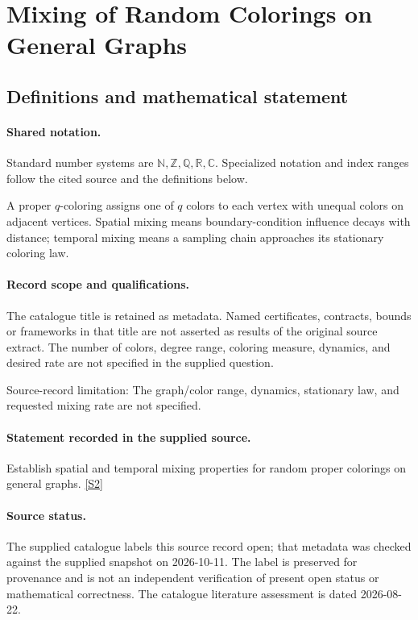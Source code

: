\documentclass[11pt]{article}
\newcommand{\sref}[2]{\hyperlink{source:#1:#2}{[S#2]}}
\begin{document}
\section{Mixing of Random Colorings on General Graphs}\label{statement}

\subsection{Definitions and mathematical statement}

\paragraph{Shared notation.}Standard number systems are $\mathbb N,\mathbb Z,\mathbb Q,\mathbb R,\mathbb C$. Specialized notation and index ranges follow the cited source and the definitions below.


A proper $q$-coloring assigns one of $q$ colors to each vertex with unequal colors on adjacent vertices. Spatial mixing means boundary-condition influence decays with distance; temporal mixing means a sampling chain approaches its stationary coloring law.
\paragraph{Record scope and qualifications.}
The catalogue title is retained as metadata. Named certificates, contracts, bounds or frameworks in that title are not asserted as results of the original source extract.
The number of colors, degree range, coloring measure, dynamics, and desired rate are not specified in the supplied question.

Source-record limitation: The graph/color range, dynamics, stationary law, and requested mixing rate are not specified.
\paragraph{Statement recorded in the supplied source.}
Establish spatial and temporal mixing properties for random proper colorings on general graphs. \sref{statement}{2}
\paragraph{Source status.}
The supplied catalogue labels this source record open; that metadata was checked against the supplied snapshot on 2026-10-11. The label is preserved for provenance and is not an independent verification of present open status or mathematical correctness. The catalogue literature assessment is dated 2026-08-22.
\end{document}
